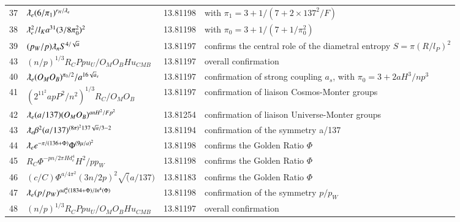\documentclass[a4paper,9pt]{article}
\begin{document}
\begin{appendix}
\begin{table}
\begin{tabular}{llll}
    37 & $\lambdabar_{e} (6/\pi_1)^{r_H/\lambdabar_e} $ & 13.81198 & with $\pi_1 = 3 + 1/ (7+2\times137^2/F)$ \\
    38 & $\lambdabar_{e}^2/l_K  a^{31} (3/8\pi_0^2)^2 $ & 13.81198 & with $\pi_0 = 3 + 1/ (7+1/\pi_0^2)$ \\
    39 & $(p_W/p) \lambdabar_{n} S^{4/\sqrt a}   $ & 13.81197 & confirms the central role of the diametral entropy  $ S = \pi (R/l_P)^2$ \\ 43 & $  (n/p)^{1/3} R_C Ppu_U/O_M O_B H u_{CMB}   $ & 13.81197 & overall confirmation  \\
    
    
     40 & $ \lambdabar_{e} (O_M O_B)^{\pi_0 /2} /a^{16\sqrt a_s}   $ & 13.81197 & confirmation of strong coupling $a_s$, with $\pi_0 = 3 +2aH^3/np^3$  \\
    
    
     41 & $  (2^{11^2} a p P^2/n^2)^{1/3} R_C/O_M O_B   $ & 13.81197 & confirmation of liaison Cosmos-Monter groups  \\
     
     
       42 & $ \lambdabar_{e} (a/137) (O_M O_B)^{anH^2/Fp^2}   $ & 13.81254 & confirmation of liaison Universe-Monter groups  \\
    
    
    43 & $ \lambdabar_{e} \beta^2 (a/137)^{(8\pi)^2 137 \sqrt a/3 -2}   $ & 13.81194 & confirmation of the symmetry a/137  \\
    
    
    44 & $ \lambdabar_{e} e^{-\pi/(136+\Phi)} \Phi^{(9\mu /a)^2}   $ & 13.81198 & confirms the Golden Ratio $\Phi$ \\
    
    
    45 & $ R_C \Phi^{-pn/2\pi Hd_e^4} H^2/pp_W   $ & 13.81198 & confirms the Golden Ratio $\Phi$ \\
   
   
   
   
    
   46& $ (c/C) \Phi^{a/4\pi^2} (3n/2p)^2 \sqrt(a/137)  $ & 13.81183 & confirms the Golden Ratio $\Phi$ \\ 
    
    
    
    
    47 & $ \lambdabar_{e} (p/p_W)^{ad_e^4(1834+\Phi)/ln^4(\Phi)}   $ & 13.81198 & confirmation of the symmetry $p/p_W$  \\
    
    
    48 & $  (n/p)^{1/3} R_C Ppu_U/O_M O_B H u_{CMB}   $ & 13.81197 & overall confirmation  \\
    

\end{tabular}
\end{table}
\end{appendix}
\end{document}
